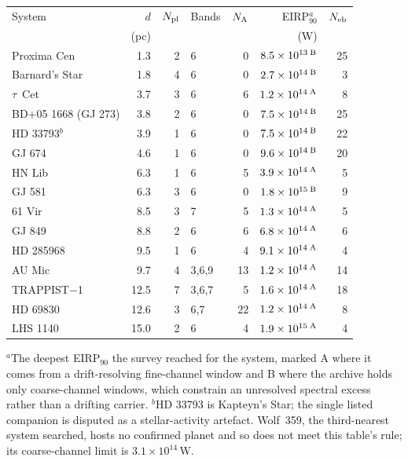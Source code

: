\begin{tabular}{@{}l@{~~}r@{~~}r@{~~}l@{~~}r@{~~}r@{~~}r@{}}
\hline
System & $d$ & $N_{\rm pl}$ & Bands & $N_{\rm A}$ & EIRP$_{90}^{a}$ & $N_{\rm eb}$ \\
 & (pc) & & & & (W) & \\
\hline
Proxima Cen & 1.3 & 2 & 6 & 0 & $8.5\times10^{13}\,^{\rm B}$ & 25 \\
Barnard's Star & 1.8 & 4 & 6 & 0 & $2.7\times10^{14}\,^{\rm B}$ & 3 \\
$\tau$~Cet & 3.7 & 3 & 6 & 6 & $1.2\times10^{14}\,^{\rm A}$ & 8 \\
BD+05 1668 (GJ 273) & 3.8 & 2 & 6 & 0 & $7.5\times10^{14}\,^{\rm B}$ & 25 \\
HD 33793$^{b}$ & 3.9 & 1 & 6 & 0 & $7.5\times10^{14}\,^{\rm B}$ & 22 \\
GJ 674 & 4.6 & 1 & 6 & 0 & $9.6\times10^{14}\,^{\rm B}$ & 20 \\
HN Lib & 6.3 & 1 & 6 & 5 & $3.9\times10^{14}\,^{\rm A}$ & 5 \\
GJ 581 & 6.3 & 3 & 6 & 0 & $1.8\times10^{15}\,^{\rm B}$ & 9 \\
61 Vir & 8.5 & 3 & 7 & 5 & $1.3\times10^{14}\,^{\rm A}$ & 5 \\
GJ 849 & 8.8 & 2 & 6 & 6 & $6.8\times10^{14}\,^{\rm A}$ & 6 \\
HD 285968 & 9.5 & 1 & 6 & 4 & $9.1\times10^{14}\,^{\rm A}$ & 4 \\
AU Mic & 9.7 & 4 & 3,6,9 & 13 & $1.2\times10^{14}\,^{\rm A}$ & 14 \\
TRAPPIST$-$1 & 12.5 & 7 & 3,6,7 & 5 & $1.6\times10^{14}\,^{\rm A}$ & 18 \\
HD 69830 & 12.6 & 3 & 6,7 & 22 & $1.2\times10^{14}\,^{\rm A}$ & 8 \\
LHS 1140 & 15.0 & 2 & 6 & 4 & $1.9\times10^{15}\,^{\rm A}$ & 4 \\
\hline
\end{tabular}

{\footnotesize $^{a}$The deepest EIRP$_{90}$ the survey reached for the system, marked A where it comes from a drift-resolving fine-channel window and B where the archive holds only coarse-channel windows, which constrain an unresolved spectral excess rather than a drifting carrier. $^{b}$HD 33793 is Kapteyn's Star; the single listed companion is disputed as a stellar-activity artefact. Wolf~359, the third-nearest system searched, hosts no confirmed planet and so does not meet this table's rule; its coarse-channel limit is $3.1\times10^{14}$\,W.}
